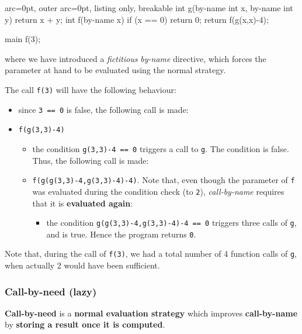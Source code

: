 \begin{tcblisting}{ arc=0pt, outer arc=0pt, listing only, breakable}
int g(by-name int x, by-name int y){
    return x + y;
}
int f(by-name x){
    if (x == 0)
        return 0;
    return f(g(x,x)-4);
}

main{
    f(3);
}

\end{tcblisting}

where we have introduced a \textit{fictitious} \textit{by-name} directive, which forces the parameter at hand to be evaluated using the normal strategy.

The call \texttt{f(3)} will have the following behaviour:
\begin{itemize}
	\item  since \texttt{3 == 0} is false, the following call is made:
	\item  \texttt{f(g(3,3)-4)}

  \begin{itemize}
  	\item  the condition \texttt{g(3,3)-4 == 0} triggers a call to \texttt{g}. The condition is false. Thus, the following call is made:
  	\item  \texttt{f(g(g(3,3)-4,g(3,3)-4)-4)}. Note that, even though the parameter of \texttt{f} was evaluated during the condition check (to \texttt{2}), \textit{call-by-name} requires that it is \textbf{evaluated again}:

    \begin{itemize}
    	\item  the condition \texttt{g(g(3,3)-4,g(3,3)-4)-4 == 0} triggers three calls of \texttt{g}, and is true. Hence the program returns \texttt{0}.
    \end{itemize}
  \end{itemize}
\end{itemize}

Note that, during the call of \texttt{f(3)}, we had a total number of 4 function calls of \texttt{g}, when actually 2 would have been sufficient.

\subsubsection*{ Call-by-need (lazy) }

\textbf{Call-by-need} is a \textbf{normal evaluation strategy} which improves \textbf{call-by-name} by \textbf{storing a result once it is computed}.

